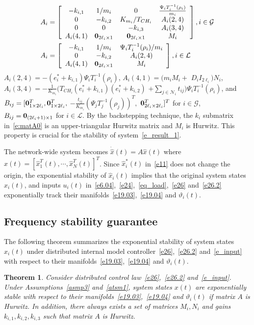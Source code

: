 \documentclass[journal]{IEEEtran}
\newcommand{\nnum}{\nonumber}
\newcommand{\GG}{{\mathcal{G}}}
\newcommand{\LL}{{\mathcal{L}}}
\newcommand{\NN}{{\mathcal{N}}}
\newtheorem{theorem}{\bf Theorem}[section]
\begin{document}
\begin{align}
&A_i =
\left[
\begin{array}{cccc}
-k_{i,1}&1/m_i&0&\frac{\Psi_i T_i^{-1}(\rho_i)}{m_i}\\
0&-k_{i,2}&{K_{m_i}}/{T_{CH_i}}&A_i(2,4)\\
0&0&-k_{i,3}&A_i(3,4)\\
A_i(4,1)&\bold{0}_{2\ell_i \times 1}&\bold{0}_{2\ell_i \times 1}&M_i\\
\end{array}
\right], i \in {\GG}\nnum\\
&A_i =
\left[
\begin{array}{ccc}
-k_{i,1}&1/m_i&\Psi_i T_i^{-1}(\rho_i)/m_i\\
0&-k_{i,2}&A_i(2,4)\\
A_i(4,1)&\bold{0}_{2\ell_i \times 1}&M_i\\
\end{array}
\right], i\in{\LL}
\label{e:matA0}
\end{align}
$A_i(2,4)=-(e_i^*+k_{i,1})\Psi_iT_i^{-1}(\rho_i)$,
$A_i(4,1)=(m_iM_i+$ $ D_i I_{2\ell_i})N_i$,
$A_i(3,4)=-\frac{1}{K_{m_i}}(T_{CH_i}(e_i^*+k_{i,1})(e^*_i+k_{i,2})$ $+\sum_{j \in {{\NN}}_i}t_{ij}) \Psi_iT_i^{-1}(\rho_i)$,
and $B_{ij}=[\bold{0}_{1 \times 2\ell_i}^T,\bold{0}_{1 \times 2\ell_i}^T,$ $-\frac{t_{ij}}{K_{m_i}}(\Psi_j T_j^{-1}(\rho_j))^T,$ $\bold{0}_{2 \ell_i \times 2 \ell_i}^T]^T$ for $i \in {\GG}$, $B_{ij}=\bold{0}_{(2 \ell_i+1) \times 1}$ for $i \in {\LL}$.
By the backstepping technique, the $k_i$ submatrix in~\eqref{e:matA0} is an upper-triangular Hurwitz matrix and $M_i$ is Hurwitz. This property is crucial for the stability of system~\eqref{e_result_1}.

The network-wide system becomes $\dot{\hat{x}}(t)=A\hat{x}(t)$ where $\hat{x}(t)=[\hat{x}_{1}^T(t),\cdots,\hat{x}_{N}^T(t)]^T$.
Since $\hat{x}_i^{*}(t)$ in~\eqref{e11} does not change the origin, the exponential stability of $\hat{x}_i(t)$ implies that the original system states $x_i(t)$, and inputs $u_i(t)$ in~\eqref{e6.04},~\eqref{e24},~\eqref{eq_load},~\eqref{e26} and~\eqref{e26.2} exponentially track their manifolds~\eqref{e19.03},~\eqref{e19.04} and $\vartheta_i(t)$. 

\subsection{Frequency stability guarantee}\label{sec:stab1}
The following theorem summarizes the exponential stability of system states $x_{i}(t)$ under distributed internal model controller~\eqref{e26},~\eqref{e26.2} and~\eqref{e_input} with respect to their manifolds~\eqref{e19.03},~\eqref{e19.04} and $\vartheta_i(t)$.
\begin{theorem}
Consider distributed control law~\eqref{e26},~\eqref{e26.2} and~\eqref{e_input}. Under Assumptions~\ref{asmp3} and~\ref{atsm1}, system states $x(t)$ are exponentially stable with respect to their manifolds~\eqref{e19.03},~\eqref{e19.04} and $\vartheta_i(t)$ if matrix $A$ is Hurwitz. In addition, there always exists a set of matrices $M_i,N_i$ and gains $k_{i,1}, k_{i,2}, k_{i,3}$ such that matrix $A$ is Hurwitz.
\label{attheo1}
\end{theorem}
\end{document}
